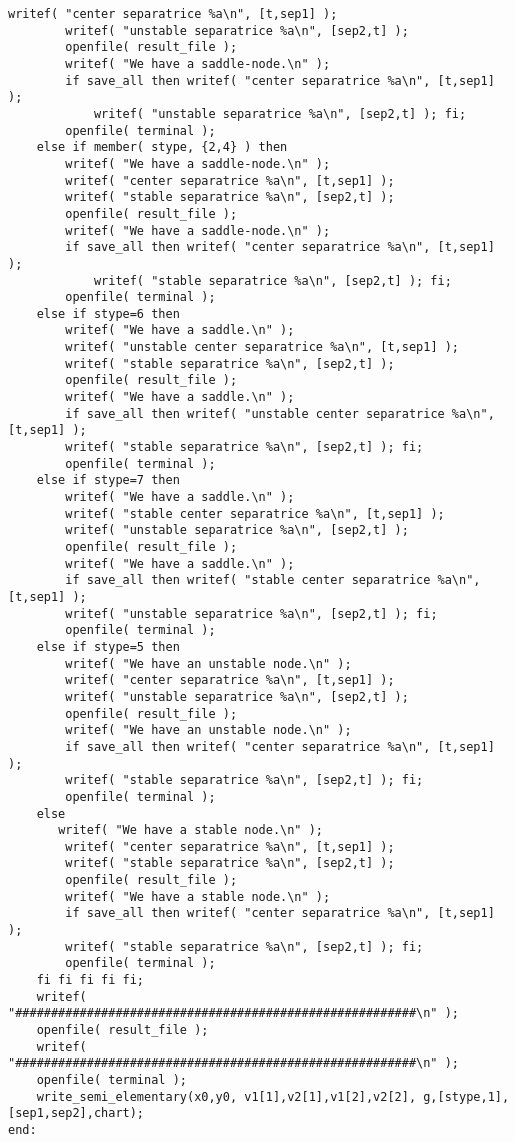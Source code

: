 \documentclass[a4paper,10pt]{article}
\begin{document}
\begin{lstlisting}[name=type]
        writef( "center separatrice %a\n", [t,sep1] );
        writef( "unstable separatrice %a\n", [sep2,t] );
        openfile( result_file );
        writef( "We have a saddle-node.\n" );
        if save_all then writef( "center separatrice %a\n", [t,sep1] );
            writef( "unstable separatrice %a\n", [sep2,t] ); fi;
        openfile( terminal );
    else if member( stype, {2,4} ) then
        writef( "We have a saddle-node.\n" );
        writef( "center separatrice %a\n", [t,sep1] );
        writef( "stable separatrice %a\n", [sep2,t] );
        openfile( result_file );
        writef( "We have a saddle-node.\n" );
        if save_all then writef( "center separatrice %a\n", [t,sep1] );
            writef( "stable separatrice %a\n", [sep2,t] ); fi;
        openfile( terminal );
    else if stype=6 then
        writef( "We have a saddle.\n" );
        writef( "unstable center separatrice %a\n", [t,sep1] );
        writef( "stable separatrice %a\n", [sep2,t] );
        openfile( result_file );
        writef( "We have a saddle.\n" );
        if save_all then writef( "unstable center separatrice %a\n", [t,sep1] );
        writef( "stable separatrice %a\n", [sep2,t] ); fi;
        openfile( terminal );
    else if stype=7 then
        writef( "We have a saddle.\n" );
        writef( "stable center separatrice %a\n", [t,sep1] );
        writef( "unstable separatrice %a\n", [sep2,t] );
        openfile( result_file );
        writef( "We have a saddle.\n" );
        if save_all then writef( "stable center separatrice %a\n", [t,sep1] );
        writef( "unstable separatrice %a\n", [sep2,t] ); fi;
        openfile( terminal );
    else if stype=5 then
        writef( "We have an unstable node.\n" );
        writef( "center separatrice %a\n", [t,sep1] );
        writef( "unstable separatrice %a\n", [sep2,t] );
        openfile( result_file );
        writef( "We have an unstable node.\n" );
        if save_all then writef( "center separatrice %a\n", [t,sep1] );
        writef( "stable separatrice %a\n", [sep2,t] ); fi;
        openfile( terminal );
    else
       writef( "We have a stable node.\n" );
        writef( "center separatrice %a\n", [t,sep1] );
        writef( "stable separatrice %a\n", [sep2,t] );
        openfile( result_file );
        writef( "We have a stable node.\n" );
        if save_all then writef( "center separatrice %a\n", [t,sep1] );
        writef( "stable separatrice %a\n", [sep2,t] ); fi;
        openfile( terminal );
    fi fi fi fi fi;
    writef( "########################################################\n" );
    openfile( result_file );
    writef( "########################################################\n" );
    openfile( terminal );
    write_semi_elementary(x0,y0, v1[1],v2[1],v1[2],v2[2], g,[stype,1],[sep1,sep2],chart);
end:
\end{lstlisting}
\end{document}
